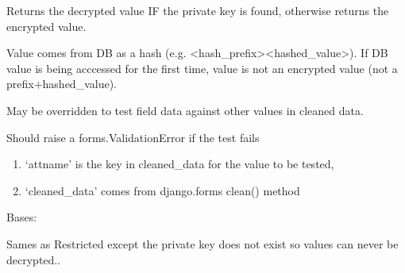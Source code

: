\documentclass[letterpaper,10pt,english]{sphinxmanual}
\begin{document}
\begin{fulllineitems}
\begin{fulllineitems}
\end{fulllineitems}


\begin{fulllineitems}
\label{field_classes:bhp_crypto.classes.BaseEncryptedField.to_python}
Returns the decrypted value IF the private key is found, otherwise returns
the encrypted value.

Value comes from DB as a hash (e.g. \textless{}hash\_prefix\textgreater{}\textless{}hashed\_value\textgreater{}). If DB value is being
acccessed for the first time, value is not an encrypted value (not a prefix+hashed\_value).

\end{fulllineitems}


\begin{fulllineitems}
\label{field_classes:bhp_crypto.classes.BaseEncryptedField.validate_with_cleaned_data}
May be overridden to test field data against other values
in cleaned data.

Should raise a forms.ValidationError if the test fails
\begin{enumerate}
\item {} 
`attname' is the key in cleaned\_data for the value to be tested,

\item {} 
`cleaned\_data' comes from django.forms clean() method

\end{enumerate}

\end{fulllineitems}


\end{fulllineitems}


\begin{fulllineitems}
\label{field_classes:bhp_crypto.fields.IrreversibleRsaEncryptionField}
Bases: 

Sames as Restricted except the private key does not exist so values can never be decrypted..

\end{fulllineitems}
\end{document}
